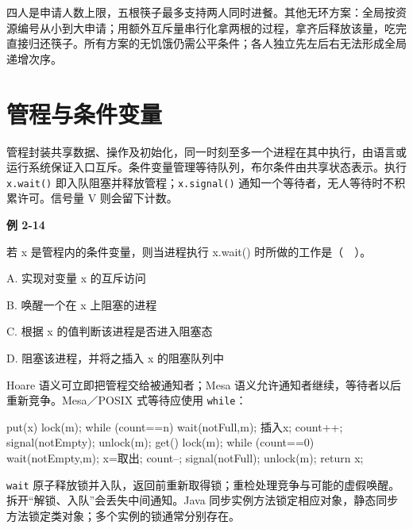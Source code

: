 四人是申请人数上限，五根筷子最多支持两人同时进餐。其他无环方案：全局按资源编号从小到大申请；用额外互斥量串行化拿两根的过程，拿齐后释放该量，吃完直接归还筷子。所有方案的无饥饿仍需公平条件；各人独立先左后右无法形成全局递增次序。

\section{管程与条件变量}\label{OS02-monitor}

管程封装共享数据、操作及初始化，同一时刻至多一个进程在其中执行，由语言或运行系统保证入口互斥。条件变量管理等待队列，布尔条件由共享状态表示。执行 \texttt{x.\allowbreak{}wait(\allowbreak{})\allowbreak{}} 即入队阻塞并释放管程；\texttt{x.\allowbreak{}signal(\allowbreak{})\allowbreak{}} 通知一个等待者，无人等待时不积累许可。信号量 V 则会留下计数。

\par\medskip{}\noindent\hypertarget{OS02-E14}{}\label{OS02-E14}\textbf{例 2-14}\par\nobreak\smallskip

若 x 是管程内的条件变量，则当进程执行 x.wait() 时所做的工作是（　）。

A. 实现对变量 x 的互斥访问

B. 唤醒一个在 x 上阻塞的进程

C. 根据 x 的值判断该进程是否进入阻塞态

D. 阻塞该进程，并将之插入 x 的阻塞队列中

Hoare 语义可立即把管程交给被通知者；Mesa 语义允许通知者继续，等待者以后重新竞争。Mesa／POSIX 式等待应使用 \texttt{while}：

\par\smallskip\noindent\begin{minipage}{\linewidth}
\begin{codeblock}[language={}]
put(x) {
    lock(m);
    while (count==n) wait(notFull,m);
    插入x; count++;
    signal(notEmpty); unlock(m);
}
get() {
    lock(m);
    while (count==0) wait(notEmpty,m);
    x=取出; count--;
    signal(notFull); unlock(m);
    return x;
}
\end{codeblock}
\end{minipage}\par\smallskip

\texttt{wait} 原子释放锁并入队，返回前重新取得锁；重检处理竞争与可能的虚假唤醒。拆开``解锁、入队''会丢失中间通知。Java 同步实例方法锁定相应对象，静态同步方法锁定类对象；多个实例的锁通常分别存在。

